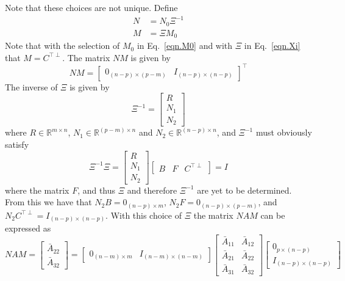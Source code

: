 \documentclass[]{../sty/JGCD}
\theoremstyle{examplestyle}
\begin{document}
  Note that these choices are not unique. Define
  \begin{align}
    \label{eqn.N}
    N&=N_{0}\Xi^{-1} \\
    \label{eqn.M}
    M&=\Xi M_{0}
  \end{align}
  Note that with the selection of $M_{0}$ in Eq.\ \eqref{eqn.M0} and with $\Xi$ in Eq.\ \eqref{eqn.Xi} that $M=C^{\top\perp}$. The matrix $NM$ is given by
  \begin{equation}
    \label{eqn.NM}
    NM=
    \begin{bmatrix}
      0_{(n-p)\times(p-m)} & I_{(n-p)\times(n-p)}
    \end{bmatrix}^{\top}
  \end{equation}
  The inverse of $\Xi$ is given by
  \begin{equation}
    \label{eqn.Xiinv}
    \Xi^{-1}=
    \begin{bmatrix}
      R \\
      N_{1} \\
      N_{2}
    \end{bmatrix}
  \end{equation}
  where $R\in\mathbb{R}^{m\times n}$, $N_{1}\in\mathbb{R}^{(p-m)\times n}$ and $N_{2}\in\mathbb{R}^{(n-p)\times n}$, and $\Xi^{-1}$ must obviously satisfy
  \begin{equation}
    \label{eqn.xixi}
    \Xi^{-1}\Xi=
    \begin{bmatrix}
      R \\
      N_{1} \\
      N_{2}
    \end{bmatrix}
    \begin{bmatrix}
      B & F & C^{\top\perp}
    \end{bmatrix}=
    I
  \end{equation}
  where the matrix $F$, and thus $\Xi$ and therefore $\Xi^{-1}$ are yet to be determined.
  From this we have that $N_{2}B=0_{(n-p)\times m} $, $N_{2}F=0_{(n-p)\times(p-m)}$, and $N_{2}C^{\top\perp}=I_{(n-p)\times(n-p)}$.
  With this choice of $\Xi$ the matrix $NAM$ can be expressed as
  \begin{equation}
    \label{eqn.NAM}
    NAM=
    \begin{bmatrix}
      \bar{A}_{22} \\
      \bar{A}_{32}
    \end{bmatrix}=
    \begin{bmatrix}
      0_{(n-m)\times m} & I_{(n-m)\times(n-m)}
    \end{bmatrix}
    \left[
    \begin{array}{c|c} %
      \bar{A}_{11} & \bar{A}_{12} \\
      \hline %
      \bar{A}_{21} & \bar{A}_{22} \\
      \hline %
      \bar{A}_{31} & \bar{A}_{32}
    \end{array}\right]
    \begin{bmatrix}
      0_{p\times(n-p)} \\
      I_{(n-p)\times(n-p)}
    \end{bmatrix}
  \end{equation}
\end{document}
